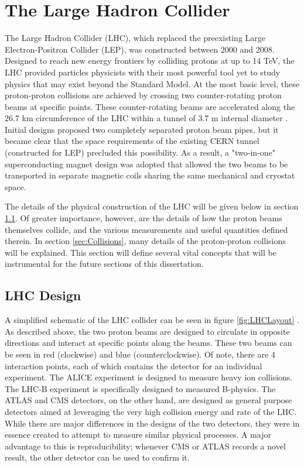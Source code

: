 \documentclass[12pt]{ucsddissertation}
\begin{document}
\section{The Large Hadron Collider}
The Large Hadron Collider (LHC), which replaced the preexisting Large Electron-Positron Collider (LEP), was constructed between 2000 and 2008. Designed to reach new energy frontiers by colliding protons at up to 14 TeV, the LHC provided particles physicists with their most powerful tool yet to study physics that may exist beyond the Standard Model. At the most basic level, these proton-proton collisions are achieved by crossing two counter-rotating proton beams at specific points. These counter-rotating beams are accelerated along the 26.7 km circumference of the LHC within a tunnel of 3.7 m internal diameter \cite{LHC2008}. Initial designs proposed two completely separated proton beam pipes, but it became clear that the space requirements of the existing CERN tunnel (constructed for LEP) precluded this possibility. As a result, a "two-in-one" superconducting magnet design was adopted that allowed the two beams to be transported in separate magnetic coils sharing the same mechanical and cryostat space.

The details of the physical construction of the LHC will be given below in section \ref{sec:LHCDesign}. Of greater importance, however, are the details of how the proton beams themselves collide, and the various measurements and useful quantities defined therein. In section \ref{sec:Collisions}, many details of the proton-proton collisions will be explained. This section will define several vital concepts that will be instrumental for the future sections of this dissertation.
\subsection{LHC Design} \label{sec:LHCDesign}
A simplified schematic of the LHC collider can be seen in figure \ref{fig:LHCLayout} \cite{LHC2008}. As described above, the two proton beams are designed to circulate in opposite directions and interact at specific points along the beams. These two beams can be seen in red (clockwise) and blue (counterclockwise). Of note, there are 4 interaction points, each of which contains the detector for an individual experiment. The ALICE experiment is designed to measure heavy ion collisions. The LHC-B experiment is specifically designed to measured B-physics. The ATLAS and CMS detectors, on the other hand, are designed as general purpose detectors aimed at leveraging the very high collision energy and rate of the LHC. While there are major differences in the designs of the two detectors, they were in essence created to attempt to measure similar physical processes. A major advantage to this is reproducibility; whenever CMS or ATLAS records a novel result, the other detector can be used to confirm it.
\end{document}
